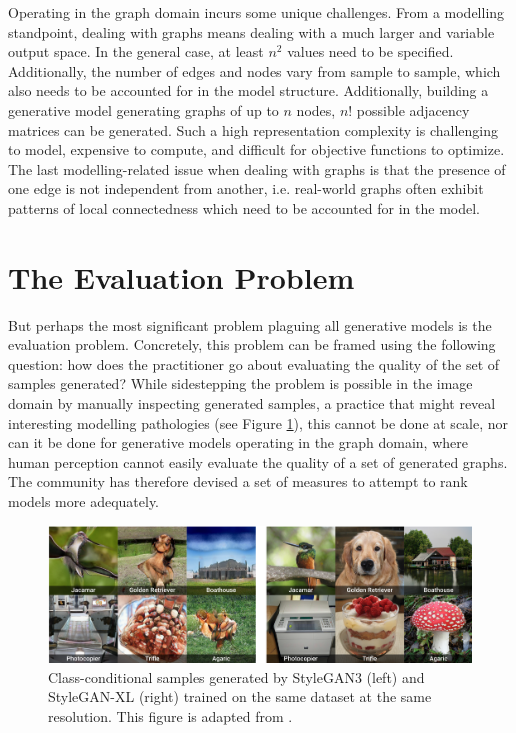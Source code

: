 Operating in the graph domain incurs some unique challenges. From a modelling
standpoint, dealing with graphs means dealing with a much larger and variable
output space. In the general case, at least $n^2$ values need to be specified.
Additionally, the number of edges and nodes vary from sample to sample, which
also needs to be accounted for in the model structure. Additionally, building a
generative model generating graphs of up to $n$ nodes, $n!$ possible adjacency
matrices can be generated. Such a high representation complexity is challenging
to model, expensive to compute, and difficult for objective functions to
optimize. The last modelling-related issue when dealing with graphs is that the
presence of one edge is not independent from another, i.e. real-world graphs
often exhibit patterns of local connectedness which need to be accounted for in
the model.

\section{The Evaluation Problem}\label{sec:evalproblem}

But perhaps the most significant problem plaguing all generative models is the
evaluation problem. Concretely, this problem can be framed using the following
question: how does the practitioner go about evaluating the quality of the set
of samples generated? While sidestepping the problem is possible in the image
domain by manually inspecting generated samples, a practice that might reveal
interesting modelling pathologies (see Figure \ref{fig:ganpathologies}), this
cannot be done at scale, nor can it be done for generative models operating in
the graph domain, where human perception cannot easily evaluate the quality of a
set of generated graphs. The community has therefore devised a set of measures
to attempt to rank models more adequately.

\begin{figure}
  \centering
  \includegraphics[width=\textwidth]{figures/pathologies.png}
  \caption[Class-conditional samples from StyleGAN3 and
  StyleGAN-XL]{Class-conditional samples generated by StyleGAN3 (left) and
    StyleGAN-XL (right) trained on the same dataset at the same resolution. This
    figure is adapted from \cite{sauer2022stylegan}.}
  \label{fig:ganpathologies}
\end{figure}

